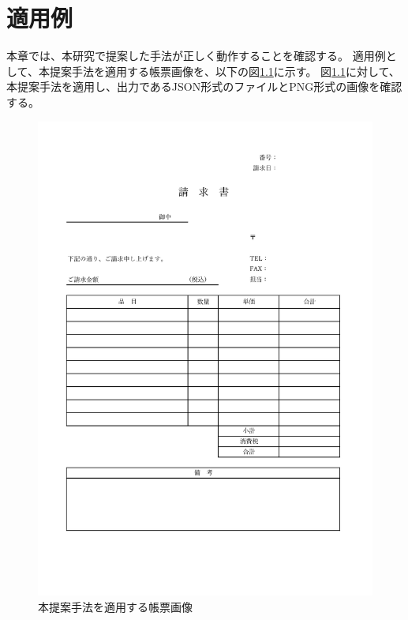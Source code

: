 \chapter{適用例}\label{cha:Indication}
本章では、本研究で提案した手法が正しく動作することを確認する。
適用例として、本提案手法を適用する帳票画像を、以下の図\ref{fig:indication_original}に示す。
図\ref{fig:indication_original}に対して、本提案手法を適用し、出力であるJSON形式のファイルとPNG形式の画像を確認する。

\begin{figure}[t]
    \begin{center}
        \includegraphics[width=15cm]{image/05-indication/indication_original.jpg}
        \caption{本提案手法を適用する帳票画像}
        \label{fig:indication_original}
    \end{center}
\end{figure}



